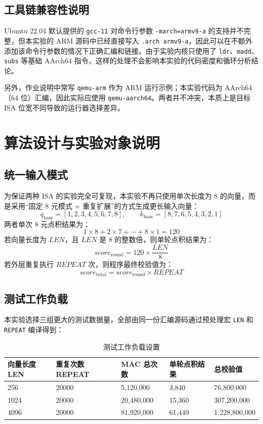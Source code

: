 \documentclass{article}
\begin{document}
\subsection{工具链兼容性说明}
Ubuntu 22.04 默认提供的 \texttt{gcc-11} 对命令行参数 \texttt{-march=armv9-a} 的支持并不完整，但本实验的 ARM 源码中已经直接写入 \texttt{.arch armv9-a}，因此可以在不额外添加该命令行参数的情况下正确汇编和链接。由于实验内核只使用了 \texttt{ldr}、\texttt{madd}、\texttt{subs} 等基础 AArch64 指令，这样的处理不会影响本实验的代码密度和循环分析结论。

另外，作业说明中常写 \texttt{qemu-arm} 作为 ARM 运行示例；本实验代码为 AArch64（64 位）汇编，因此实际应使用 \texttt{qemu-aarch64}。两者并不冲突，本质上是目标 ISA 位宽不同导致的运行器选择差异。

\section{算法设计与实验对象说明}
\subsection{统一输入模式}
为保证两种 ISA 的实验完全可复现，本实验不再只使用单次长度为 $8$ 的向量，而是采用“固定 8 元模式 + 重复扩展”的方式生成更长输入向量：
\[
q_{\text{base}} = [1,2,3,4,5,6,7,8], \qquad
k_{\text{base}} = [8,7,6,5,4,3,2,1]
\]
两者单次 8 元点积结果为：
\[
1\times8 + 2\times7 + \cdots + 8\times1 = 120
\]
若向量长度为 $LEN$，且 $LEN$ 是 8 的整数倍，则单轮点积结果为：
\[
score_{\text{round}} = 120 \times \frac{LEN}{8}
\]
若外层重复执行 $REPEAT$ 次，则程序最终校验值为：
\[
score_{\text{total}} = score_{\text{round}} \times REPEAT
\]

\subsection{测试工作负载}
本实验选择三组更大的测试数据量，全部由同一份汇编源码通过预处理宏 \texttt{LEN} 和 \texttt{REPEAT} 编译得到：
\begin{table}[H]
    \centering
    \caption{测试工作负载设置}
    \begin{tabular}{p{} p{} p{} p{} p{}}
        \toprule
        向量长度 LEN & 重复次数 REPEAT & MAC 总次数 & 单轮点积结果 & 总校验值 \\
        \midrule
        256 & 20000 & 5,120,000 & 3,840 & 76,800,000 \\
        1024 & 20000 & 20,480,000 & 15,360 & 307,200,000 \\
        4096 & 20000 & 81,920,000 & 61,440 & 1,228,800,000 \\
        \bottomrule
    \end{tabular}
\end{table}
\end{document}
